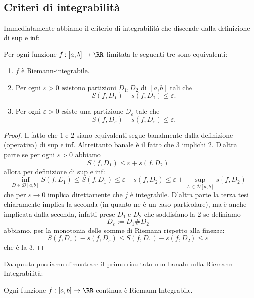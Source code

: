 \documentclass[11pt]{scrartcl}
\begin{document}
	\subsection{Criteri di integrabilità}
	
	Immediatamente abbiamo il criterio di integrabilità che discende dalla definizione di sup e inf:
	\begin{theorem}
		Per ogni funzione $f:[a,b]\to\RR$ limitata le seguenti tre sono equivalenti:
		\begin{enumerate}
			\item $f$ è Riemann-integrabile.
			\item Per ogni $\varepsilon>0$ esistono partizioni $D_1,D_2$ di $[a,b]$ tali che
			$$S(f,D_1)-s(f,D_2)\le \varepsilon.$$
			\item Per ogni $\varepsilon>0$ esiste una partizione $D_\varepsilon$ tale che
			$$S(f,D_\varepsilon)-s(f,D_\varepsilon)\le \varepsilon.$$
		\end{enumerate}
	\end{theorem}
	\begin{proof}
		Il fatto che $1$ e $2$ siano equivalenti segue banalmente dalla definizione (operativa) di sup e inf. Altrettanto banale è il fatto che $3$ implichi $2$. D'altra parte se per ogni $\varepsilon>0$ abbiamo
		$$S(f,D_1)\le\varepsilon+s(f,D_2)$$
		allora per definizione di sup e inf:
		$$\inf_{D\in \mathcal{D}[a,b]} S(f,D_1)\le S(f,D_1)\le\varepsilon+s(f,D_2) \le \varepsilon+\sup_{D\in \mathcal{D}[a,b]} s(f,D_2)$$
		che per $\varepsilon\to 0$ implica direttamente che $f$ è integrabile. D'altra parte la terza tesi chiaramente implica la seconda (in quanto ne è un caso particolare), ma è anche implicata dalla seconda, infatti prese $D_1$ e $D_2$ che soddisfano la $2$ se definiamo 
		$$D_\varepsilon:=D_1\# D_2$$
		abbiamo, per la monotonia delle somme di Riemann rispetto alla finezza:
		$$S(f,D_\varepsilon)-s(f,D_\varepsilon)\le S(f,D_1)-s(f,D_2)\le \varepsilon$$
		che è la $3$.
	\end{proof}
	Da questo possiamo dimostrare il primo risultato non banale sulla Riemann-Integrabilità:
	\begin{theorem}
		Ogni funzione $f:[a,b]\to\RR$ continua è Riemann-Integrabile.
	\end{theorem}
\end{document}
